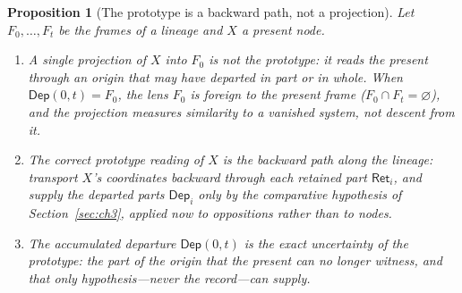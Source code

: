 \documentclass[11pt,a4paper]{article}
\newtheorem{proposition}[principle]{Proposition}
\theoremstyle{remark}
\newcommand{\Dep}{\ensuremath{\mathsf{Dep}}}             %
\newcommand{\Ret}{\ensuremath{\mathsf{Ret}}}             %
\begin{document}
\begin{proposition}[The prototype is a backward path, not a projection]
\label{prop:prototype}
Let $F_0,\dots,F_t$ be the frames of a lineage and $X$ a present node.
\begin{enumerate}[leftmargin=*,nosep]
  \item A single projection of $X$ into $F_0$ is not the prototype: it
    reads the present through an origin that may have departed in part or
    in whole. When $\Dep(0,t) = F_0$, the lens $F_0$ is foreign to the
    present frame ($F_0 \cap F_t = \varnothing$), and the projection
    measures similarity to a vanished system, not descent from it.
  \item The correct prototype reading of $X$ is the backward path along
    the lineage: transport $X$'s coordinates backward through each
    \emph{retained} part $\Ret_i$, and supply the \emph{departed} parts
    $\Dep_i$ only by the comparative hypothesis of Section~\ref{sec:ch3},
    applied now to oppositions rather than to nodes.
  \item The accumulated departure $\Dep(0,t)$ is the exact uncertainty of
    the prototype: the part of the origin that the present can no longer
    witness, and that only hypothesis---never the record---can supply.
\end{enumerate}
\end{proposition}
\end{document}
